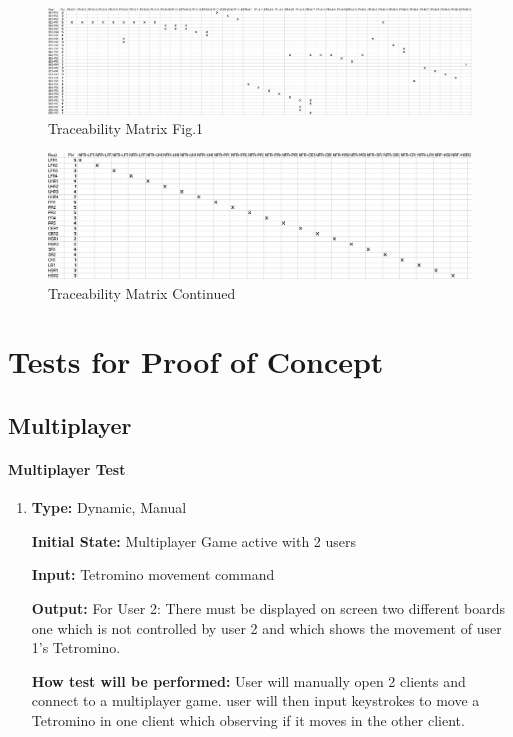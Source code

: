 \documentclass[12pt, titlepage]{article}
\begin{document}
	
	\begin{figure}[H]
		\centering
		\includegraphics[width=1.2\textwidth]{traceabilitymatrix1.png}
		\caption{Traceability Matrix Fig.1}
		\label{fig:tm1}
	\end{figure}
	
	
	\begin{figure}[H]
		\centering
		\includegraphics[width=1.2\textwidth]{traceabilitymatrix2.png} 
		\caption{Traceability Matrix Continued}
		\label{fig:tm2}
	\end{figure}
	
	
	\section{Tests for Proof of Concept}
	
	\subsection{Multiplayer}
	
	\paragraph{Multiplayer Test}
	
	\begin{enumerate}[{POC-}1. ]
		
		\item
		
		\textbf{Type:} Dynamic, Manual
		
		\textbf{Initial State:} Multiplayer Game active with 2 users
		
		\textbf{Input:} Tetromino movement command
		
		\textbf{Output:} For User 2: There must be displayed on screen two different boards one which is not controlled by user 2 and which shows the movement of user 1's Tetromino.
		
		\textbf{How test will be performed:} User will manually open 2 clients and connect to a multiplayer game. user will then input keystrokes to move a Tetromino in one client which observing if it moves in the other client.
		
	\end{enumerate}
	
\end{document}
